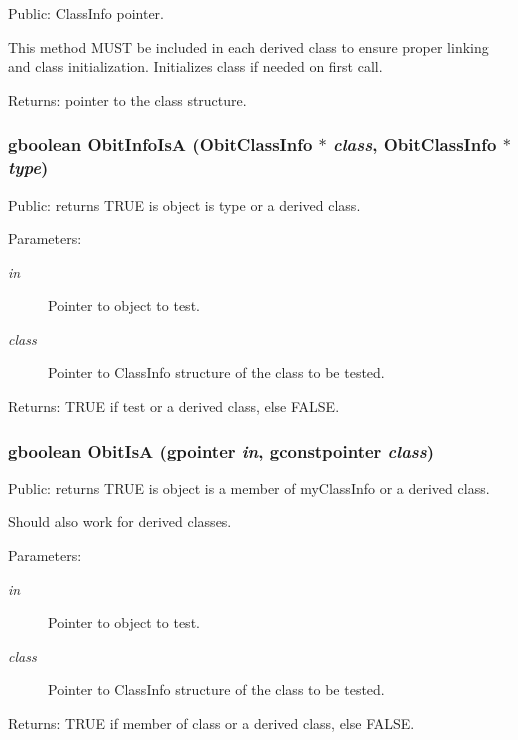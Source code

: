 Public: Class\-Info pointer. 

This method MUST be included in each derived class to ensure proper linking and class initialization. Initializes class if needed on first call. \begin{Desc}
\item[Returns:]pointer to the class structure. \end{Desc}
\subsubsection{\setlength{\rightskip}{0pt plus 5cm}gboolean Obit\-Info\-Is\-A ({\bf Obit\-Class\-Info} $\ast$ {\em class}, {\bf Obit\-Class\-Info} $\ast$ {\em type})}\label{Obit_8h_a26}


Public: returns TRUE is object is type or a derived class. 

\begin{Desc}
\item[Parameters:]
\begin{description}
\item[{\em in}]Pointer to object to test. \item[{\em class}]Pointer to Class\-Info structure of the class to be tested. \end{description}
\end{Desc}
\begin{Desc}
\item[Returns:]TRUE if test or a derived class, else FALSE. \end{Desc}
\subsubsection{\setlength{\rightskip}{0pt plus 5cm}gboolean Obit\-Is\-A (gpointer {\em in}, gconstpointer {\em class})}\label{Obit_8h_a20}


Public: returns TRUE is object is a member of my\-Class\-Info or a derived class. 

Should also work for derived classes. \begin{Desc}
\item[Parameters:]
\begin{description}
\item[{\em in}]Pointer to object to test. \item[{\em class}]Pointer to Class\-Info structure of the class to be tested. \end{description}
\end{Desc}
\begin{Desc}
\item[Returns:]TRUE if member of class or a derived class, else FALSE. \end{Desc}
